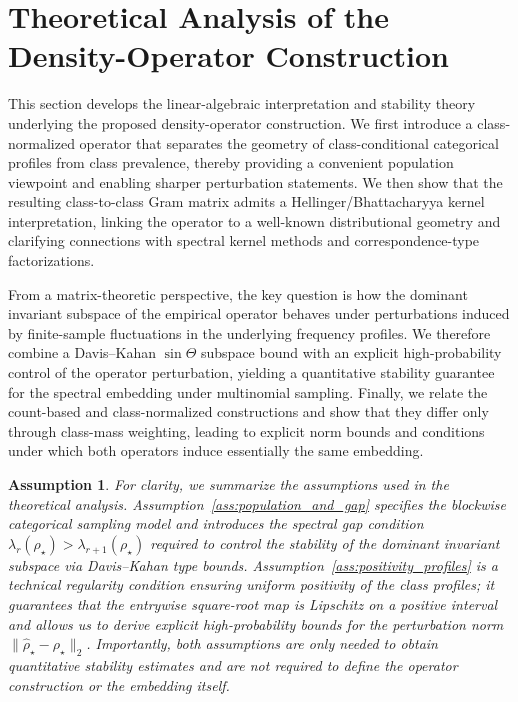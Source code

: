 \documentclass[preprint,11pt]{elsarticle}
\newtheorem{Assumption}[Theorem]{Assumption}
\begin{document}

\section{Theoretical Analysis of the Density-Operator Construction}
\label{sec:theory_comparison}

This section develops the linear-algebraic interpretation and stability theory underlying the proposed density-operator construction.
We first introduce a class-normalized operator that separates the geometry of class-conditional categorical profiles from class prevalence,
thereby providing a convenient population viewpoint and enabling sharper perturbation statements.
We then show that the resulting class-to-class Gram matrix admits a Hellinger/Bhattacharyya kernel interpretation, linking the operator to
a well-known distributional geometry and clarifying connections with spectral kernel methods and correspondence-type factorizations.

From a matrix-theoretic perspective, the key question is how the dominant invariant subspace of the empirical operator behaves under
perturbations induced by finite-sample fluctuations in the underlying frequency profiles. We therefore combine a Davis--Kahan
$\sin\Theta$ subspace bound with an explicit high-probability control of the operator perturbation, yielding a quantitative stability
guarantee for the spectral embedding under multinomial sampling.
Finally, we relate the count-based and class-normalized constructions and show that they differ only through class-mass weighting, leading
to explicit norm bounds and conditions under which both operators induce essentially the same embedding.

\begin{Assumption}
    For clarity, we summarize the assumptions used in the theoretical analysis.
    Assumption~\ref{ass:population_and_gap} specifies the blockwise categorical sampling model and introduces the spectral gap
    condition $\lambda_r(\rho_\star)>\lambda_{r+1}(\rho_\star)$ required to control the stability of the dominant invariant subspace via
    Davis--Kahan type bounds. Assumption~\ref{ass:positivity_profiles} is a technical regularity condition ensuring uniform positivity of the
    class profiles; it guarantees that the entrywise square-root map is Lipschitz on a positive interval and allows us to derive explicit
    high-probability bounds for the perturbation norm $\|\widehat\rho_\star-\rho_\star\|_2$. Importantly, both assumptions are only needed to obtain
    quantitative stability estimates and are not required to define the operator construction or the embedding itself.
\end{Assumption}
\end{document}
